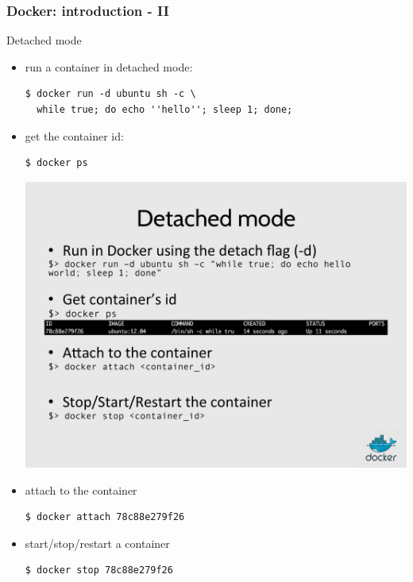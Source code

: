 \documentclass[9pt]{beamer}
\begin{document}
\begin{frame}[fragile]
  \frametitle{Docker: introduction - II}


\begin{block}{}
  Detached mode
  \begin{itemize}
    \item run a container in detached mode:
\begin{verbatim}
$ docker run -d ubuntu sh -c \
  while true; do echo ''hello''; sleep 1; done;
\end{verbatim}

    \item get the container id:
\begin{verbatim}
$ docker ps
\end{verbatim}
\begin{center}
  \includegraphics[width=1.0\linewidth]{figs/docker-ps.pdf}
\end{center}

    \item attach to the container
\begin{verbatim}
$ docker attach 78c88e279f26
\end{verbatim}

    \item start/stop/restart a container
\begin{verbatim}
$ docker stop 78c88e279f26
\end{verbatim}

  \end{itemize}
\end{block}

\end{frame}
\end{document}
